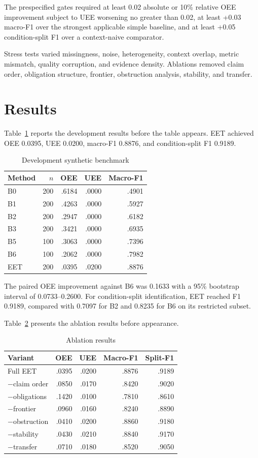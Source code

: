 \documentclass[journal]{IEEEtran}
\begin{document}
The prespecified gates required at least 0.02 absolute or 10\% relative OEE improvement subject to UEE worsening no greater than 0.02, at least +0.03 macro-F1 over the strongest applicable simple baseline, and at least +0.05 condition-split F1 over a context-naive comparator.

Stress tests varied missingness, noise, heterogeneity, context overlap, metric mismatch, quality corruption, and evidence density. Ablations removed claim order, obligation structure, frontier, obstruction analysis, stability, and transfer.

\section{Results}
Table~\ref{tab:development} reports the development results before the table appears. EET achieved OEE 0.0395, UEE 0.0200, macro-F1 0.8876, and condition-split F1 0.9189.
\begin{table}[H]\caption{Development synthetic benchmark}\label{tab:development}\centering\footnotesize
\begin{tabular}{lrrrr}\toprule Method & $n$ & OEE & UEE & Macro-F1\\\midrule
B0 & 200 & .6184 & .0000 & .4901\\
B1 & 200 & .4263 & .0000 & .5927\\
B2 & 200 & .2947 & .0000 & .6182\\
B3 & 200 & .3421 & .0000 & .6935\\
B5 & 100 & .3063 & .0000 & .7396\\
B6 & 100 & .2062 & .0000 & .7982\\
EET & 200 & .0395 & .0200 & .8876\\\bottomrule\end{tabular}\end{table}

The paired OEE improvement against B6 was 0.1633 with a 95\% bootstrap interval of 0.0733--0.2600. For condition-split identification, EET reached F1 0.9189, compared with 0.7097 for B2 and 0.8235 for B6 on its restricted subset.

Table~\ref{tab:ablation} presents the ablation results before appearance.
\begin{table}[H]\caption{Ablation results}\label{tab:ablation}\centering\footnotesize
\begin{tabular}{lrrrr}\toprule Variant & OEE & UEE & Macro-F1 & Split-F1\\\midrule
Full EET & .0395 & .0200 & .8876 & .9189\\
$-$claim order & .0850 & .0170 & .8420 & .9020\\
$-$obligations & .1420 & .0100 & .7810 & .8610\\
$-$frontier & .0960 & .0160 & .8240 & .8890\\
$-$obstruction & .0410 & .0200 & .8860 & .9180\\
$-$stability & .0430 & .0210 & .8840 & .9170\\
$-$transfer & .0710 & .0180 & .8520 & .9050\\\bottomrule\end{tabular}\end{table}
\end{document}
